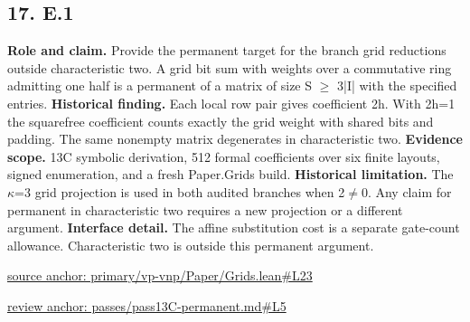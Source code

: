 \documentclass[11pt,letterpaper]{article}
\theoremstyle{definition}\newtheorem{definition}[theorem]{Definition}\newtheorem{example}[theorem]{Example}
\theoremstyle{remark}\newtheorem{remark}[theorem]{Remark}
\begin{document}
\subsection*{17. E.1}
\textbf{Role and claim.} Provide the permanent target for the branch grid reductions outside characteristic two. A grid bit sum with weights over a commutative ring admitting one half is a permanent of a matrix of size S \ensuremath{\ge} 3|I| with the specified entries.
\textbf{Historical finding.} Each local row pair gives coefficient 2h. With 2h=1 the squarefree coefficient counts exactly the grid weight with shared bits and padding. The same nonempty matrix degenerates in characteristic two.
\textbf{Evidence scope.} 13C symbolic derivation, 512 formal coefficients over six finite layouts, signed enumeration, and a fresh Paper.Grids build.
\textbf{Historical limitation.} The \ensuremath{\kappa}=3 grid projection is used in both audited branches when 2\ensuremath{\ne}0. Any claim for permanent in characteristic two requires a new projection or a different argument.
\textbf{Interface detail.} The affine substitution cost is a separate gate-count allowance. Characteristic two is outside this permanent argument.
\par\href{https://github.com/nousentllc/VP-VNP-Review/blob/8a7976933b6b2b4ffda1ad3a0dfb5fc6b6f023e8/primary/vp-vnp/Paper/Grids.lean\#L23}{source anchor: primary/vp-vnp/Paper/Grids.lean\#L23}
\par\href{https://github.com/nousentllc/VP-VNP-Review/blob/8a7976933b6b2b4ffda1ad3a0dfb5fc6b6f023e8/passes/pass13C-permanent.md\#L5}{review anchor: passes/pass13C-permanent.md\#L5}
\goodbreak
{}
\hypertarget{claim.18}{}
\end{document}
